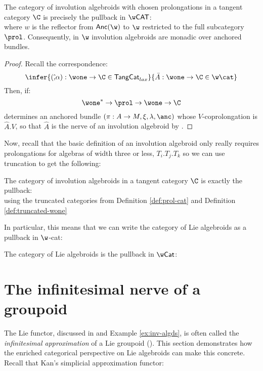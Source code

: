 \begin{theorem}%
	\label{thm:pullback-in-cat-of-cats-inv-algd}
	The category of involution algebroids with chosen prolongations in a tangent category $\C$ is precisely the pullback in $\w\mathsf{CAT}$:
	\begin{equation}\label{eq:prol2}
		
	\end{equation}
	where $w$ is the reflector from $\mathsf{Anc}(\w)$ to $\w$ restricted to the full subcategory $\prol$. Consequently, in $\w$ involution algebroids are monadic over anchored bundles.
\end{theorem}
\begin{proof}
	Recall the correspondence:
	\[
		\infer{(\hat, \alpha): \wone \to \C \in \mathsf{TangCat}_{lax}}
		{\bar A: \wone \to \C \in \w\cat}
	\]
	Then, if:
	\[
		\wone^* \to \prol \to \wone \to \C	
	\]
	determines an anchored bundle $(\pi:A \to M, \xi, \lambda, \anc)$ whose $V$-coprolongation is $\hat A.V$, so that $\hat A$ is the nerve of an involution algebroid by .
\end{proof}
Now, recall that the basic definition of an involution algebroid only really requires prolongations for algebras of width three or less, $T_{i}.T_j.T_k$ so we can use truncation to get the following:
\begin{corollary}
	The category of involution algebroids in a tangent category $\C$ is exactly the pullback:
	\begin{equation}\label{eq:prol3}
		
	\end{equation}
	using the truncated categories from Definition \ref{def:prol-cat} and Definition \ref{def:truncated-wone}
\end{corollary}
In particular, this means that we can write the category of Lie algebroids as a pullback in $\w$-cat:
\begin{corollary}
	The category of Lie algebroids is the pullback in $\w\mathsf{Cat}$:
	\[\]
\end{corollary}



\section{The infinitesimal nerve of a groupoid}%
\label{sec:inf-nerve-of-a-gpd}


The Lie functor, discussed in  and Example \ref{ex:inv-algds}, is often called the \emph{infinitesimal approximation} of a Lie groupoid (\cite{nlab:lie_group}). This section demonstrates how the enriched categorical perspective on Lie algebroids can make this concrete. Recall that Kan's simplicial approximation functor:

